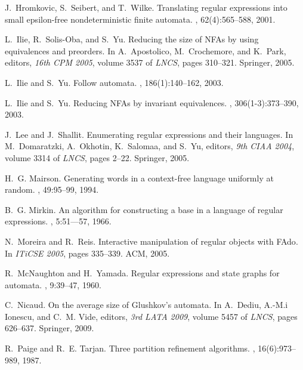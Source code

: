 \documentclass{llncs}
\begin{document}
\begin{thebibliography}{EKSW05}
J.~Hromkovic, S.~Seibert, and T.~Wilke.
\newblock Translating regular expressions into small epsilon-free
  nondeterministic finite automata.
, 62(4):565--588, 2001.

L.~Ilie, R.~Solis-Oba, and S.~Yu.
\newblock Reducing the size of {NFA}s by using equivalences and preorders.
\newblock In A.~Apostolico, M.~Crochemore, and K.~Park, editors, {\em 16th CPM
  2005}, volume 3537 of {\em LNCS}, pages 310--321. Springer, 2005.

L.~Ilie and S.~Yu.
\newblock Follow automata.
, 186(1):140--162, 2003.

L.~Ilie and S.~Yu.
\newblock Reducing {NFA}s by invariant equivalences.
, 306(1-3):373--390, 2003.

J.~Lee and J.~Shallit.
\newblock Enumerating regular expressions and their languages.
\newblock In M.~Domaratzki, A.~Okhotin, K.~Salomaa, and S.~Yu, editors, {\em
  9th CIAA 2004}, volume 3314 of {\em LNCS}, pages 2--22. Springer, 2005.

H.~G. Mairson.
\newblock Generating words in a context-free language uniformly at random.
, 49:95--99, 1994.

B.~G. Mirkin.
\newblock An algorithm for constructing a base in a language of regular
  expressions.
, 5:51---57, 1966.

N.~Moreira and R.~Reis.
\newblock Interactive manipulation of regular objects with {FAdo}.
\newblock In {\em ITiCSE 2005}, pages 335--339. ACM, 2005.

R.~McNaughton and H.~Yamada.
\newblock Regular expressions and state graphs for automata.
, 9:39--47, 1960.

C.~Nicaud.
\newblock On the average size of {Glushkov}'s automata.
\newblock In A.~Dediu, A.-M.i Ionescu, and C.~M. Vide, editors, {\em 3rd LATA
  2009}, volume 5457 of {\em LNCS}, pages 626--637. Springer, 2009.

R.~Paige and R.~E. Tarjan.
\newblock Three partition refinement algorithms.
, 16(6):973--989, 1987.

\end{thebibliography}
\end{document}
